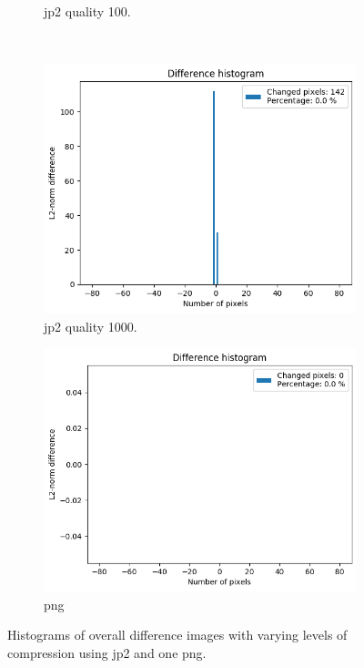 \begin{figure}[htb]
\begin{subfigure}[b]{0.49\textwidth}
            \caption{\gls{jp2} quality 100.}
            \label{fig:img_quality_histogram_100}
        \end{subfigure}
        \\
        \begin{subfigure}[b]{0.49\textwidth}
            \centering
            \includegraphics[width=\textwidth]{doc/thesis/0_figures/compare_quality/set1/histograms/jp2_1000_diff_histogram.png}
            \caption{\gls{jp2} quality 1000.}
            \label{fig:img_quality_histogram_1000}
        \end{subfigure}
        \begin{subfigure}[b]{0.49\textwidth}
            \centering
            \includegraphics[width=\textwidth]{doc/thesis/0_figures/compare_quality/set1/histograms/png_diff_histogram.png}
            \caption{\gls{png}}
            \label{fig:img_quality_histogram_png}
        \end{subfigure}
    \caption{Histograms of overall difference images with varying levels of compression using \gls{jp2} and one \gls{png}.}
    \label{fig:img_quality_histogram}
\end{figure}

